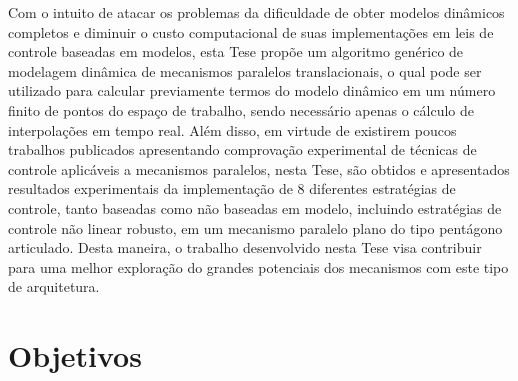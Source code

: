 \documentclass[]{politex}
\begin{document}
Com o intuito de atacar os problemas da dificuldade de obter modelos dinâmicos completos e diminuir o custo computacional de suas implementações em leis de controle baseadas em modelos, esta Tese propõe um algoritmo genérico de modelagem dinâmica de mecanismos paralelos translacionais, o qual pode ser utilizado para calcular previamente termos do modelo dinâmico em um número finito de pontos do espaço de trabalho, sendo necessário apenas o cálculo de interpolações em tempo real.  Além disso, em virtude de existirem poucos  trabalhos publicados apresentando comprovação experimental de técnicas de controle aplicáveis a mecanismos paralelos, nesta Tese, são obtidos e apresentados resultados experimentais da implementação de 8 diferentes estratégias de controle, tanto baseadas como não baseadas em modelo, incluindo estratégias de controle não linear robusto, em um mecanismo paralelo plano do tipo pentágono articulado. Desta maneira, o trabalho desenvolvido nesta Tese visa contribuir para uma melhor exploração do grandes potenciais dos mecanismos com este tipo de arquitetura.


    

\newpage
\section{Objetivos}\label{objetivos}
\end{document}

